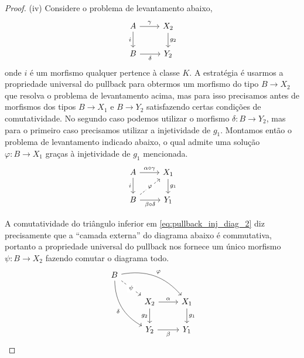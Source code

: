\begin{proof}
  \smallskip
  (iv) Considere o problema de levantamento abaixo,
  \begin{displaymath}
    \begin{tikzcd}
      A
      \arrow[r, "\gamma"]
      \arrow[d, "i" swap]
      & X_2
      \arrow[d, "g_2"]
      \\ B
      \arrow[r, "\delta" swap]
      & Y_2
    \end{tikzcd}
  \end{displaymath}
  onde $i$ é um morfismo qualquer pertence à classe $K$.
  A estratégia é usarmos a propriedade universal do pullback para obtermos um morfismo do tipo $B \to X_2$ que resolva o problema de levantamento acima, mas para isso precisamos antes de morfismos dos tipos $B \to X_1$ e $B \to Y_2$ satisfazendo certas condições de comutatividade.
  No segundo caso podemos utilizar o morfismo $\delta: B \to Y_2$, mas para o primeiro caso precisamos utilizar a injetividade de $g_1$.
  Montamos então o problema de levantamento indicado abaixo, o qual admite uma solução $\varphi: B \to X_1$ graças à injetividade de $g_1$ mencionada.
  \begin{equation}\label{eq:pullback_inj_diag_2}
    \begin{tikzcd}
      A
      \arrow[r, "\alpha \circ \gamma"]
      \arrow[d, "i" swap]
      & X_1
      \arrow[d, "g_1"]
      \\ B
      \arrow[ru, dashed, "\varphi" description]
      \arrow[r, "\beta \circ \delta" swap]
      & Y_1
    \end{tikzcd}
  \end{equation}

  A comutatividade do triângulo inferior em \eqref{eq:pullback_inj_diag_2} diz precisamente que a ``camada externa'' do diagrama abaixo é commutativa, portanto a propriedade universal do pullback nos fornece um único morfismo $\psi: B \to X_2$ fazendo comutar o diagrama todo.
  \begin{equation}\label{eq:pullback_inj_diag_3}
    \begin{tikzcd}
      B
      \arrow[rd, dashed, "\psi" description]
      \arrow[rrd, bend left=30, "\varphi"]
      \arrow[rdd, bend right=30, "\delta" swap]
      \\ & X_2
      \arrow[r, "\alpha"]
      \arrow[d, "g_2" swap]
      & X_1
      \arrow[d, "g_1"]
      \\ & Y_2
      \arrow[r, "\beta" swap]
      & Y_1
    \end{tikzcd}
  \end{equation}


\end{proof}
